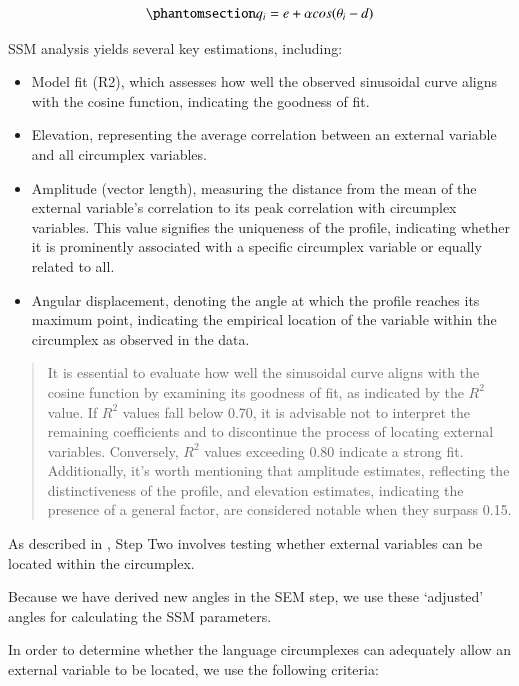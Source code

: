 \documentclass[
  authoryear,
  preprint,
  3p]{elsarticle}
\providecommand{\tightlist}{%
  \setlength{\itemsep}{0pt}\setlength{\parskip}{0pt}}\usepackage{longtable,booktabs,array}
\begin{document}
\begin{equation}\phantomsection\label{eq-ssm}{
q_i = e + \alpha cos(\theta_i - d)
}\end{equation}

SSM analysis yields several key estimations, including:

\begin{itemize}
\tightlist
\item
  Model fit (R2), which assesses how well the observed sinusoidal curve
  aligns with the cosine function, indicating the goodness of fit.
\item
  Elevation, representing the average correlation between an external
  variable and all circumplex variables.
\item
  Amplitude (vector length), measuring the distance from the mean of the
  external variable's correlation to its peak correlation with
  circumplex variables. This value signifies the uniqueness of the
  profile, indicating whether it is prominently associated with a
  specific circumplex variable or equally related to all.
\item
  Angular displacement, denoting the angle at which the profile reaches
  its maximum point, indicating the empirical location of the variable
  within the circumplex as observed in the data.
\end{itemize}

\begin{quote}
It is essential to evaluate how well the sinusoidal curve aligns with
the cosine function by examining its goodness of fit, as indicated by
the \(R^2\) value. If \(R^2\) values fall below 0.70, it is advisable
not to interpret the remaining coefficients and to discontinue the
process of locating external variables. Conversely, \(R^2\) values
exceeding 0.80 indicate a strong fit. Additionally, it's worth
mentioning that amplitude estimates, reflecting the distinctiveness of
the profile, and elevation estimates, indicating the presence of a
general factor, are considered notable when they surpass 0.15.
\end{quote}

As described in \citet{Rogoza2021three}, Step Two involves testing
whether external variables can be located within the circumplex.

Because we have derived new angles in the SEM step, we use these
`adjusted' angles for calculating the SSM parameters.

In order to determine whether the language circumplexes can adequately
allow an external variable to be located, we use the following criteria:
\end{document}
